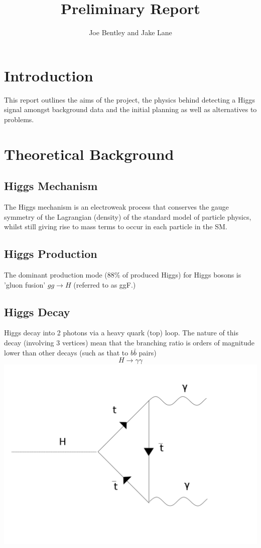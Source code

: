 \documentclass{article}
\title{Preliminary Report}
\author{Joe Bentley and Jake Lane}
\begin{document}
\section{Introduction}
This report outlines the aims of the project, the physics behind detecting a Higgs signal amongst background data and the initial planning as well as alternatives to problems.
\section{Theoretical Background}
\subsection{Higgs Mechanism}
The Higgs mechanism is an electroweak process that conserves the gauge symmetry of the Lagrangian (density) of the standard model of particle physics, whilst still giving rise to mass terms to occur in each particle in the SM.
\subsection{Higgs Production}
The dominant production mode (88\% of produced Higgs) for Higgs bosons is 'gluon fusion' $gg \rightarrow H$  (referred to as ggF.) 
\subsection{Higgs Decay}
Higgs decay into 2 photons via a heavy quark (top) loop. The nature of this decay (involving 3 vertices) mean that the branching ratio is orders of magnitude lower than other decays (such as that to $b \bar{b}$ pairs)
\begin{equation}
H \rightarrow \gamma \gamma
\end{equation}
\includegraphics[scale=0.25]{higgsdecaydiphoton}
\end{document}
